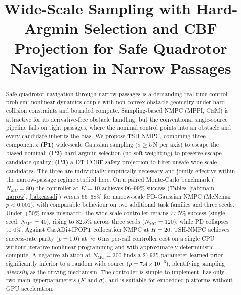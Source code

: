 \documentclass[11pt,onecolumn,a4paper]{article}
\newcommand{\Nm}{N_{\mathrm{MC}}}
\begin{document}
\title{\textbf{Wide-Scale Sampling with Hard-Argmin Selection and CBF Projection
for Safe Quadrotor Navigation in Narrow Passages}}


\date{}
\maketitle

\begin{abstract}\noindent
Safe quadrotor navigation through narrow passages is a demanding
real-time control problem: nonlinear dynamics couple with non-convex
obstacle geometry under hard collision constraints and bounded compute.
Sampling-based NMPC (MPPI, CEM) is attractive for its derivative-free
obstacle handling, but the conventional single-source pipeline fails
on tight passages, where the nominal control points into an obstacle
and every candidate inherits the bias. We propose TSH-NMPC, combining
three components: \textbf{(P1)} wide-scale Gaussian sampling
($\sigma \ge 5\,$N per axis) to escape the biased nominal;
\textbf{(P2)} hard-argmin selection (no soft weighting) to preserve
escape-candidate quality; \textbf{(P3)} a DT-CCBF safety projection
to filter unsafe wide-scale candidates. The three are individually
empirically necessary and jointly effective within the narrow-passage
regime studied here. On a paired Monte-Carlo benchmark ($\Nm = 80$)
the controller at $K = 10$ achieves $96$--$99\%$ success
(Tables~\ref{tab:main-narrow}, \ref{tab:casadi}) versus $66$--$68\%$
for narrow-scale PD-Gaussian NMPC (McNemar $p < 0.001$), with
comparable behaviour on two additional task families and three seeds.
Under $+50\%$ mass mismatch, the wide-scale controller retains
$77.5\%$ success (single-seed, $\Nm = 40$), rising to $82.5\%$ across
three seeds ($\Nm = 120$), while PD collapses to $0\%$. Against
CasADi+IPOPT collocation NMPC at $H = 20$, TSH-NMPC achieves
success-rate parity ($p = 1.0$) at ${\approx}\,6\,$ms per-call
controller cost on a single CPU without iterative nonlinear
programming and with approximately deterministic compute. A negative
ablation at $\Nm = 300$ finds a 27\,935-parameter learned prior
significantly inferior to a random wide source ($p = 7.4\times 10^{-6}$),
identifying sampling \emph{diversity} as the driving mechanism. The
controller is simple to implement, has only two main hyperparameters
($K$ and $\sigma$), and is suitable for embedded platforms without
GPU acceleration.
\end{abstract}
\end{document}
